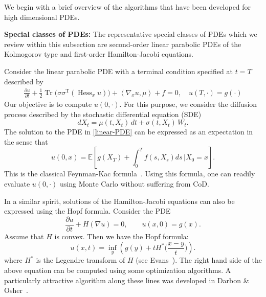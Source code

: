 \documentclass[12pt,AutoFakeBold,AutoFakeSlant]{article}
\theoremstyle{definition}
\DeclareMathOperator{\Tr}{Tr}
\newcommand{\E}{\mathbb{E}}
\newcommand{\bx}{{x}}
\newcommand{\bX}{{X}}
\begin{document}
	We begin with a brief overview of the algorithms that have been developed for high dimensional PDEs.

	\vspace{.1in}
	\noindent
	{\bf Special classes of PDEs:} 
	The representative special classes of PDEs 
	which we review within this subsection  
	are second-order linear parabolic PDEs of the Kolmogorov type 
	and first-order Hamilton-Jacobi equations. 

	Consider the linear parabolic PDE with a terminal condition specified at $ t = T $ described by
	\begin{align}
	\label{linear-PDE}
		\frac{ \partial u}{ \partial t } 
		+ \frac{1}{2} \! \Tr\!\big( \sigma\sigma^{\operatorname{T}}( \operatorname{Hess}_x u) \big)
		+ \left< \nabla_x u, \mu \right> + f = 0, \quad u(T, \cdot) = g(\cdot)
	\end{align}
	Our objective is to compute $ u(0, \cdot)$. 
	For this purpose, we consider the diffusion process described by 
	the stochastic differential equation (SDE)
	\begin{equation}
	d\bX_t = \mu( t, \bX_t )\, dt + \sigma( t, \bX_t ) \, W_t .
	\end{equation}
	The solution to the PDE in \eqref{linear-PDE} can be expressed 
	as an expectation in the sense that
	\begin{equation}
	u(0,\bx) = \E\!\left[ g(\bX_T)+\int_0^T f(s, \bX_s) ds \, \bigg| \bX_0=\bx \right].
	\end{equation}
	This is the classical  Feynman-Kac formula~\cite{Karatzas1998,oksendal2013stochastic}.
	Using this formula, one can readily evaluate $u(0, \cdot)$ using Monte Carlo without suffering from CoD. 



	In a similar spirit, solutions of the Hamilton-Jacobi equations 
	can also be expressed using the Hopf formula.  
	Consider the PDE
	\begin{equation}
	\frac{ \partial u }{ \partial t } + H( \nabla u ) = 0, \qquad u(\bx, 0) = g(\bx).
	\end{equation}
	Assume that $H$ is convex.  Then we have the Hopf formula:
	\begin{equation}
	u(\bx, t) = \inf_{y} \left( g(y) + t H^*\Big(\frac{\bx - y}{t}\Big) \right).
	\end{equation}
	where $H^*$ is the Legendre transform of $ H $ (see Evans~\cite{Evans2010partial}). 
	The right hand side of the above equation can be computed using
	some optimization algorithms. 
	A particularly attractive algorithm along these lines 
	was developed in Darbon \& Osher~\cite{DarbonOsher2016}.
\end{document}
